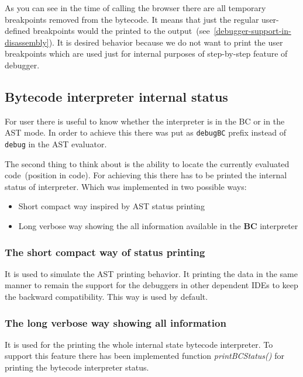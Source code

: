 \documentclass[thesis=M,english]{FITthesis}[2018/10/20]
\newcommand{\code}[1]{\texttt{#1}}
\begin{document}
As you can see in the time of calling the browser there are all temporary breakpoints removed from the bytecode. It means that just the regular user-defined breakpoints would the printed to the output~(see~\ref{debugger-support-in-disassembly}). It is desired behavior because we do not want to print the user breakpoints which are used just for internal purposes of step-by-step feature of debugger.

\subsection{Bytecode interpreter internal status}\label{bytecode-interpreter-internal-status}

For user there is useful to know whether the interpreter is in the BC or in the AST mode. In order to achieve this there was put as \code{debugBC} prefix instead of \code{debug} in the AST evaluator.

The second thing to think about is the ability to locate the currently evaluated code~(position in code). For achieving this there has to be printed the internal status of interpreter. Which was implemented in two possible ways:

\begin{itemize}
	\item Short compact way inspired by AST status printing
	\item Long verbose way showing the all information available in the \textbf{BC} interpreter
\end{itemize}

\subsubsection{The short compact way of status printing}\label{short-compact-way-of-status-printing}
It is used to simulate the AST printing behavior. It printing the data in the same manner to remain the support for the debuggers in other dependent IDEs to keep the backward compatibility. This way is used by default.

\subsubsection{The long verbose way showing all information}
It is used for the printing the whole internal state bytecode interpreter. To support this feature there has been implemented function \textit{printBCStatus()} for printing the bytecode interpreter status.
\end{document}
